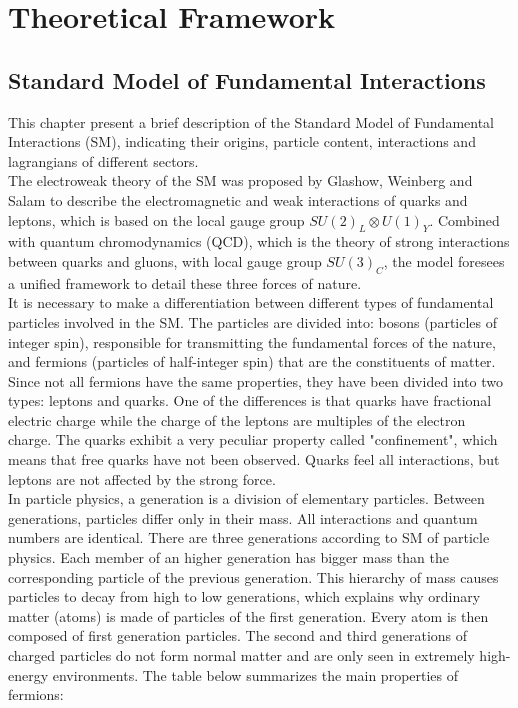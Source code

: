 \chapter{Theoretical Framework}


\section{Standard Model of Fundamental Interactions}

This chapter present a brief description of the Standard Model of Fundamental Interactions (SM), indicating their origins, particle content, interactions and  lagrangians of different sectors.\\
\indent
The electroweak theory of the SM was proposed by Glashow, Weinberg and Salam \cite{glashow,weinberg,salam} to describe the electromagnetic and weak interactions of quarks and leptons, which is based on the local gauge group  $SU(2)_{L}\otimes U(1)_{Y}$.
Combined with quantum chromodynamics (QCD), which is the theory of strong interactions between quarks and gluons, with local gauge group $SU(3)_{C}$, the model foresees a unified framework to detail these three forces of nature.\\
\indent
It is necessary to make a differentiation between different types of fundamental particles involved in the SM. The particles are divided into: bosons (particles of integer spin), responsible for transmitting the fundamental forces of the nature, and fermions (particles of half-integer spin) that are the constituents of matter. Since not all fermions have the same properties, they have been divided into two types: leptons and quarks. One of the differences is that quarks have fractional electric charge while the charge of the leptons are multiples of the electron charge. The quarks exhibit a very peculiar property called "confinement", which means that free quarks have not been observed. Quarks feel all interactions, but leptons are not affected by the strong force.\\
\indent
In particle physics, a generation is a division of elementary particles. Between generations, particles differ only in their mass. All interactions and quantum numbers are identical. There are three generations according to SM of particle physics. Each member of an higher generation has bigger mass than the corresponding particle of the previous generation. This hierarchy of mass causes particles to decay from high to low generations, which explains why ordinary matter (atoms) is made of particles of the first generation. Every atom is then composed of first generation particles. The second and third generations of charged particles do not form normal matter and are only seen in extremely high-energy environments. The table below  summarizes the main properties of fermions:

